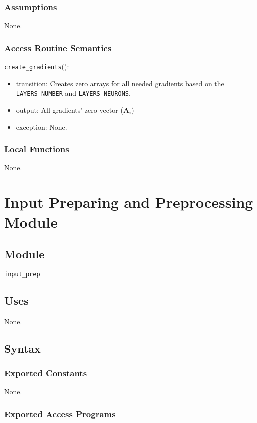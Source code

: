\documentclass[12pt, titlepage]{article}
\def\code#1{\texttt{#1}}
\begin{document}
\subsubsection{Assumptions}
None.

\subsubsection{Access Routine Semantics}

\noindent \code{create\_gradients}():
\begin{itemize}
  \item transition: Creates zero arrays for all needed gradients based on the 
  \code{LAYERS\_NUMBER} and \code{LAYERS\_NEURONS}.
  \item output: All gradients' zero vector ($\mathbf{A}_{i}$)
  \item exception: None.
\end{itemize}

\subsubsection{Local Functions}
None.

\newpage

\section{Input Preparing and Preprocessing Module} \label{In-prep} 

\subsection{Module}
\code{input\_prep} 

\subsection{Uses}
None.

\subsection{Syntax}
\subsubsection{Exported Constants}
None.

\subsubsection{Exported Access Programs}
\end{document}

